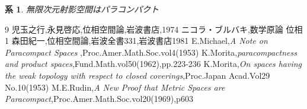 \documentclass[leqno]{jsarticle}
\newtheorem{cor}[thm]{系}
\begin{document}
\begin{cor}
無限次元射影空間はパラコンパクト
\end{cor}

\begin{thebibliography}{9}
児玉之行,永見啓応,位相空間論,岩波書店,1974
ニコラ・ブルバキ,数学原論 位相1
森田紀一,位相空間論,岩波全書331,岩波書店1981
E.Michael,{\it A Note on Paracompact Spaces },Proc.Amer.Math.Soc.vol4(1953)
K.Morita,{\it paracompactness and product spaces},Fund.Math.vol50(1962),pp.223-236
K.Morita,{\it On spaces having the weak topology with respect to closed coverings},Proc.Japan Acad.Vol29 No.10(1953)
M.E.Rudin,{\it A New Proof that Metric Spaces are Paracompact},Proc.Amer.Math.Soc.vol20(1969),p603
\end{thebibliography}


			
\end{document}
